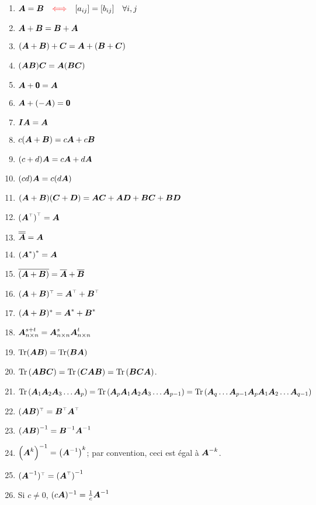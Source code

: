 \begin{adjmulticols}{1}{0in}{-2in}
\begin{enumerate}
\item $\matA = \matB \quad {\color{red}\Longleftrightarrow} \quad [a_{ij}] = [b_{ij}]  \quad \forall i, j$ \qquad{}
\item $\matA + \matB = \matB + \matA$ \qquad {}
\item $(\matA + \matB) + \matC = \matA + (\matB + \matC)$ \qquad {}
\item $(\matA\matB)\matC = \matA(\matB\matC)$ \qquad {}
\item $\matA+\zero = \matA$ \qquad {}
\item $\matA + (-\matA) = \zero$ 
\item $\matI\matA = \matA$ \qquad {}
\item $c(\matA+\matB) = c\matA + c\matB$
\item $(c+d) \matA = c\matA + d\matA$
\item $(cd) \matA = c (d\matA)$
\item $(\matA + \matB)(\matC+\matD) = \matA\matC + \matA\matD + \matB\matC + \matB\matD$
\item $\transp{\left(\transp{\matA}\right)} = \matA$
\item $\overline{\overline{\matA}} = \matA$
\item $\left(\matA^*\right)^* = \matA$
\item $\overline{(\matA+\matB)} = \overline{\matA} + \overline{\matB}$
\item $\transp{(\matA+\matB)} = \transp{\matA} + \transp{\matB}$
\item $(\matA+\matB)^* = \matA^* + \matB^*$
\item $\matA^{s+t}_{n\times n} = \matA^s_{n\times n} \matA^t_{n\times n}$
\item $\tr(\matA\matB) = \tr(\matB\matA)$
\item $\tr{(\matA\matB\matC)} = \tr{(\matC\matA\matB)} = \tr{(\matB\matC\matA)}$.
\item $
\tr{(\matA_1 \matA_2 \matA_3 \ldots \matA_p)} = \tr{(\matA_p \matA_1 \matA_2 \matA_3 \ldots \matA_{p-1})} 
= \tr{(\matA_q \ldots \matA_{p-1} \matA_p \matA_1 \matA_2 \ldots \matA_{q-1})}$
\item $\transp{(\matA\matB)} = \transp{\matB}\transp{\matA}$
\item $\left(\matA\matB\right)^{-1} = \matB^{-1}\matA^{-1}$
\item $\left(\matA^k\right)^{-1} = \left(\matA^{-1}\right)^k$; par convention, ceci est égal à $\matA^{-k}$.
\item $\transp{(\matA^{-1})} = \left(\transp{\matA}\right)^{-1}$
\item Si $c\neq 0$, $(c\matA)^{-1} = \frac{1}{c}\matA^{-1}$
\end{enumerate}


\end{adjmulticols}
